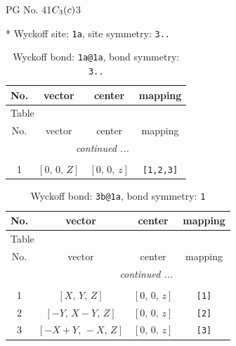 \documentclass[fleqn,8pt]{jsarticle}
\begin{document}
\setcounter{MaxMatrixCols}{32}

\renewcommand{\tablename}{Table~}
\renewcommand{\figurename}{Figure~}
\begin{center}
\LARGE
PG No. 41\quad$C_{\rm 3}(c)$\quad$3$\quad[ trigonal ]
\end{center}


* Wyckoff site: {\tt 1a}, site symmetry: {\tt 3..}
\renewcommand{\arraystretch}{1.2}
\begin{longtable}{cccc}
\caption{Wyckoff bond: {\tt 1a@1a}, bond symmetry: {\tt 3..}}
 \\
 \hline \hline
No. & vector & center & mapping \\ \hline \endfirsthead

\multicolumn{3}{l}{\tablename\ \thetable{}} \\
 \hline \hline
No. & vector & center & mapping \\ \hline \endhead

 \hline \hline
\multicolumn{3}{r}{\footnotesize\it continued ...} \\ \endfoot

 \hline \hline
\multicolumn{3}{r}{} \\ \endlastfoot

1 & $\left[ 0,\, 0,\, Z \right]$ & $\left[ 0,\, 0,\, z \right]$ & {\tt [1,2,3]} \\
\end{longtable}
\renewcommand{\arraystretch}{1.2}
\begin{longtable}{cccc}
\caption{Wyckoff bond: {\tt 3b@1a}, bond symmetry: {\tt 1}}
 \\
 \hline \hline
No. & vector & center & mapping \\ \hline \endfirsthead

\multicolumn{3}{l}{\tablename\ \thetable{}} \\
 \hline \hline
No. & vector & center & mapping \\ \hline \endhead

 \hline \hline
\multicolumn{3}{r}{\footnotesize\it continued ...} \\ \endfoot

 \hline \hline
\multicolumn{3}{r}{} \\ \endlastfoot

1 & $\left[ X,\, Y,\, Z \right]$ & $\left[ 0,\, 0,\, z \right]$ & {\tt [1]} \\ \hline
2 & $\left[ - Y,\, X - Y,\, Z \right]$ & $\left[ 0,\, 0,\, z \right]$ & {\tt [2]} \\ \hline
3 & $\left[ - X + Y,\, - X,\, Z \right]$ & $\left[ 0,\, 0,\, z \right]$ & {\tt [3]} \\
\end{longtable}
\end{document}
